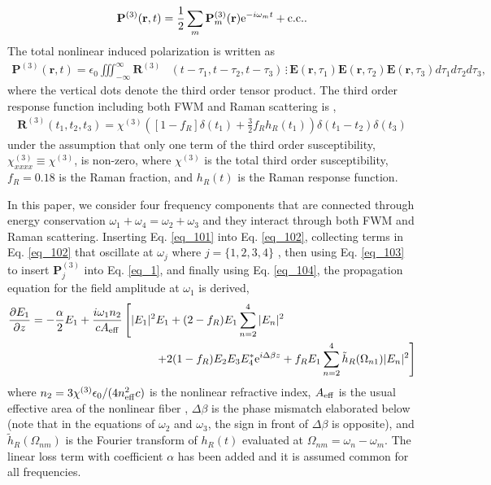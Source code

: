 \documentclass[10pt,letterpaper]{article}
\newcommand{\mb}[1]{\mathbf{#1}}
\begin{document}
\begin{align} \label{eq_103}
\mb{P}^{(3)}(\mb{r},t) = \frac{1}{2} \sum_m \mb{P}_m^{(3)}(\mb{r}) {\rm e}^{-i\omega_m t} + {\rm c.c.}.
\end{align}
The total nonlinear induced polarization is written as \cite{Agrawal}
\begin{align}\label{eq_102}
\mb{P}^{(3)}(\mb{r},t) = \epsilon_0 \iiint_{-\infty}^{\infty} \mb{R}^{(3)}&(t-\tau_1,t-\tau_2,t-\tau_3)\, \vdots \,  \mb{E}(\mb{r},\tau_1)\mb{E}(\mb{r},\tau_2) \mb{E}(\mb{r},\tau_3) d\tau_1d\tau_2d\tau_3,
\end{align}
where the vertical dots denote the third order tensor product. The third order response function including both FWM and Raman scattering is \cite{Poletti2008},
\begin{align} \label{eq_101}
\mb{R}^{(3)}(t_1,t_2,t_3) = \chi^{(3)}\left( [1-f_R]\delta(t_1) + \frac{3}{2}f_Rh_R(t_1) \right) \delta(t_1-t_2) \delta(t_3)
\end{align}
under the assumption that only one term of the third order susceptibility, $\chi^{(3)}_{xxxx} \equiv \chi^{(3)}$, is non-zero, where $\chi^{(3)}$ is the total third order susceptibility, $f_R = 0.18$ is the Raman fraction, and $h_R(t)$ is the Raman response function.

In this paper, we consider four frequency components that are connected through energy conservation $\omega_1 + \omega_4 = \omega_2 + \omega_3$ and they interact through both FWM and Raman scattering. Inserting Eq. \eqref{eq_101} into Eq. \eqref{eq_102}, collecting terms in Eq. \eqref{eq_102} that oscillate at $\omega_j$ where $j=\{1,2,3,4\}$ \cite{Headley1996}, then using Eq. \eqref{eq_103} to insert $\mb{P}_j^{(3)}$ into Eq. \eqref{eq_1}, and finally using Eq. \eqref{eq_104}, the propagation equation for the field amplitude at $\omega_1$ is derived,
\begin{align} \label{eq_105}
\begin{split}
\frac{\partial E_1}{\partial z} = - \frac{\alpha}{2}E_1 + \frac{i \omega_1n_2}{c A_{\rm eff}}& \left[ |E_1|^2 E_1 + (2-f_R) E_1\sum_{n=2}^4 |E_n|^2 \right. \\
 &\hspace{1cm} \left. + 2(1-f_R)E_2 E_3 E_4^* {\rm e}^{i\Delta \beta z} + f_RE_1\sum_{n=2}^4 \tilde{h}_R(\Omega_{n1})|E_n|^2\right]
\end{split}
\end{align} 
where $n_2 = 3\chi^{(3)}\epsilon_0/(4n_{\rm eff}^2 c)$ is the nonlinear refractive index, $A_{\rm eff}$ is the usual effective area of the nonlinear fiber \cite{Agrawal}, $\Delta \beta$ is the phase mismatch elaborated below (note that in the equations of $\omega_2$ and $\omega_3$, the sign in front of $\Delta \beta$ is opposite), and $\tilde{h}_R(\Omega_{nm})$ is the Fourier transform of $h_R(t)$ evaluated at $\Omega_{nm} = \omega_n - \omega_m$. The linear loss term with coefficient $\alpha$ has been added and it is assumed common for all frequencies.
\end{document}
